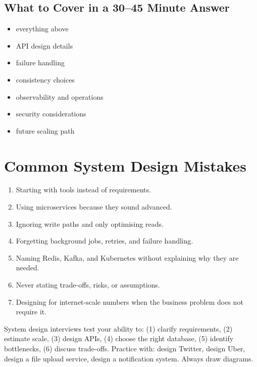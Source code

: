 \documentclass[12pt, a4paper, oneside]{book}
\begin{document}
\subsection{What to Cover in a 30--45 Minute Answer}
\begin{itemize}[leftmargin=2em]
    \item everything above
    \item API design details
    \item failure handling
    \item consistency choices
    \item observability and operations
    \item security considerations
    \item future scaling path
\end{itemize}

\section{Common System Design Mistakes}

\begin{enumerate}[leftmargin=2em]
    \item Starting with tools instead of requirements.
    \item Using microservices because they sound advanced.
    \item Ignoring write paths and only optimising reads.
    \item Forgetting background jobs, retries, and failure handling.
    \item Naming Redis, Kafka, and Kubernetes without explaining why they are needed.
    \item Never stating trade-offs, risks, or assumptions.
    \item Designing for internet-scale numbers when the business problem does not require it.
\end{enumerate}

\begin{interviewbox}
System design interviews test your ability to: (1) clarify requirements, (2) estimate scale, (3) design APIs, (4) choose the right database, (5) identify bottlenecks, (6) discuss trade-offs. Practice with: design Twitter, design Uber, design a file upload service, design a notification system. Always draw diagrams.
\end{interviewbox}
\end{document}
